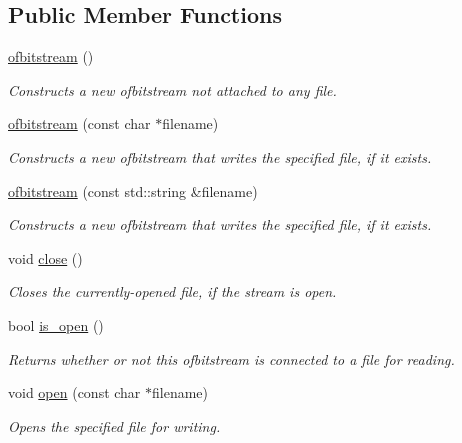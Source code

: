 \subsection*{Public Member Functions}
\begin{DoxyCompactItemize}
\item 
\mbox{\hyperlink{classofbitstream_a17657aa7e766554cdfd08cbed37d02e4}{ofbitstream}} ()
\begin{DoxyCompactList}\small\item\em Constructs a new ofbitstream not attached to any file. \end{DoxyCompactList}\item 
\mbox{\hyperlink{classofbitstream_a4f24be0f7b8620034f41673c9121f87d}{ofbitstream}} (const char $\ast$filename)
\begin{DoxyCompactList}\small\item\em Constructs a new ofbitstream that writes the specified file, if it exists. \end{DoxyCompactList}\item 
\mbox{\hyperlink{classofbitstream_a3743823306e8043638edf759f8864fab}{ofbitstream}} (const std\+::string \&filename)
\begin{DoxyCompactList}\small\item\em Constructs a new ofbitstream that writes the specified file, if it exists. \end{DoxyCompactList}\item 
void \mbox{\hyperlink{classofbitstream_a5ae591df94fc66ccb85cbb6565368bca}{close}} ()
\begin{DoxyCompactList}\small\item\em Closes the currently-\/opened file, if the stream is open. \end{DoxyCompactList}\item 
bool \mbox{\hyperlink{classofbitstream_a2f57f54d8c03b615bb31eee091d8a88a}{is\+\_\+open}} ()
\begin{DoxyCompactList}\small\item\em Returns whether or not this ofbitstream is connected to a file for reading. \end{DoxyCompactList}\item 
void \mbox{\hyperlink{classofbitstream_a57f80da790b202b27353cd8f8415b382}{open}} (const char $\ast$filename)
\begin{DoxyCompactList}\small\item\em Opens the specified file for writing. \end{DoxyCompactList}\item 

\end{DoxyCompactItemize}
